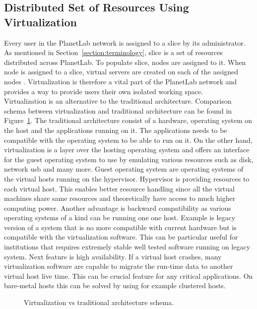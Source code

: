 \subsection{Distributed Set of Resources Using Virtualization}
\label{subsection:Virtualization}
Every user in the PlanetLab network is assigned to a slice by its administrator. As mentioned in Section~\ref{section:terminology}, slice is a set of resources distributed across PlanetLab. To populate slice, nodes are assigned to it. When node is assigned to a slice, virtual servers are created on each of the assigned nodes \cite{planetlababout}. Virtualization is therefore a vital part of the PlanetLab network and provides a way to provide users their own isolated working space.\\
Virtualization is an alternative to the traditional architecture. Comparison schema between virtualization and traditional architecture can be found in  Figure~\ref{fig:virtschema}. The traditional architecture consist of a hardware, operating system on the host and the applications running on it. The applications needs to be compatible with the operating system to be able to run on it. On the other hand, virtualization is a layer over the hosting operating system and offers an interface for the guest operating system to use by emulating various resources such as disk, network usb and many more. Guest operating system are operating systems of the virtual hosts running on the hypervisor. Hypervisor is providing resources to each virtual host. This enables better resource handling since all the virtual machines share same resources and theoretically have access to much higher computing power. Another advantage is backward compatibility as various operating systems of a kind can be running one one host. Example is legacy version of a system that is no more compatible with current hardware but is compatible with the virtualization software. This can be particular useful for institutions that requires extremely stable well tested software running on legacy system. Next feature is high availability. If a virtual host crashes, many virtualization software are capable to migrate the run-time data to another virtual host live time. This can be crucial feature for any critical applications. On bare-metal hosts this can be solved by using for example clustered hosts.\\

\begin{figure}[H]
	\centering
	\caption{Virtualization vs traditional architecture schema.}
	\label{fig:virtschema}
\end{figure}

